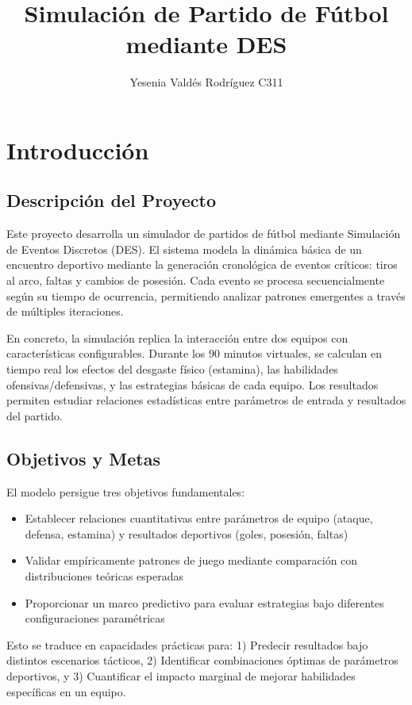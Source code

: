 \documentclass{article}
\title{Simulación de Partido de Fútbol mediante DES}
\author{Yesenia Valdés Rodríguez C311}
\begin{document}
\maketitle


\section{Introducción}

\subsection{Descripción del Proyecto}
Este proyecto desarrolla un simulador de partidos de fútbol mediante Simulación de Eventos Discretos (DES). El sistema modela la dinámica básica de un encuentro deportivo mediante la generación cronológica de eventos críticos: tiros al arco, faltas y cambios de posesión. Cada evento se procesa secuencialmente según su tiempo de ocurrencia, permitiendo analizar patrones emergentes a través de múltiples iteraciones.

En concreto, la simulación replica la interacción entre dos equipos con características configurables. Durante los 90 minutos virtuales, se calculan en tiempo real los efectos del desgaste físico (estamina), las habilidades ofensivas/defensivas, y las estrategias básicas de cada equipo. Los resultados permiten estudiar relaciones estadísticas entre parámetros de entrada y resultados del partido.

\subsection{Objetivos y Metas}
El modelo persigue tres objetivos fundamentales:
\begin{itemize}
    \item Establecer relaciones cuantitativas entre parámetros de equipo (ataque, defensa, estamina) y resultados deportivos (goles, posesión, faltas)
    \item Validar empíricamente patrones de juego mediante comparación con distribuciones teóricas esperadas
    \item Proporcionar un marco predictivo para evaluar estrategias bajo diferentes configuraciones paramétricas
\end{itemize}

Esto se traduce en capacidades prácticas para: 
1) Predecir resultados bajo distintos escenarios tácticos, 
2) Identificar combinaciones óptimas de parámetros deportivos, y 
3) Cuantificar el impacto marginal de mejorar habilidades específicas en un equipo.
\end{document}
